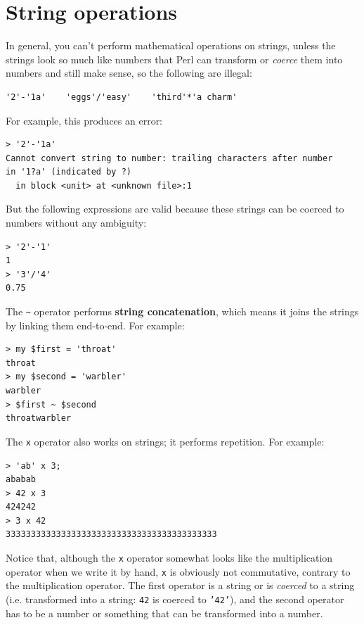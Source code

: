 \section{String operations}
\label{string_operations}

In general, you can't perform mathematical operations on strings, unless
the strings look so much like numbers that Perl can transform or \emph{coerce} them into numbers and still make sense, so the 
following are illegal:

\begin{verbatim}
'2'-'1a'    'eggs'/'easy'    'third'*'a charm'
\end{verbatim}
%

For example, this produces an error:

\begin{verbatim}
> '2'-'1a'
Cannot convert string to number: trailing characters after number 
in '1?a' (indicated by ?)
  in block <unit> at <unknown file>:1
\end{verbatim}
%
  
But the following expressions are valid because these strings 
can be coerced to numbers without any ambiguity:
\begin{verbatim}
> '2'-'1'
1
> '3'/'4'
0.75
\end{verbatim}
%

The \verb'~' operator performs {\bf string concatenation}, which means
it joins the strings by linking them end-to-end.  For example:

\begin{verbatim}
> my $first = 'throat'
throat
> my $second = 'warbler'
warbler
> $first ~ $second
throatwarbler
\end{verbatim}
%
The {\tt x} operator also works on strings; it performs repetition.
For example:

\begin{verbatim}
> 'ab' x 3;
ababab
> 42 x 3
424242
> 3 x 42
333333333333333333333333333333333333333333
\end{verbatim}

Notice that, although the {\tt x} operator somewhat looks like 
the multiplication operator when we write it by hand, {\tt x} 
is obviously not commutative, contrary to the {\tt *} 
multiplication operator. The first operator is a string or is 
\emph{coerced} to a string (i.e. transformed into a string: 
{\tt 42} is coerced to {\tt '42'}), and the second operator 
has to be a number or something that can be transformed 
into a number.


